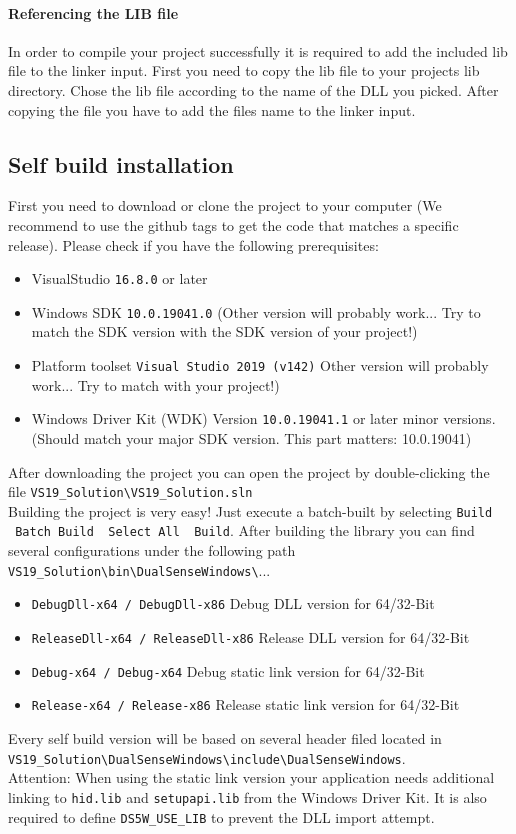 \paragraph{Referencing the LIB file}
In order to compile your project successfully it is required to add the included lib file to the linker input. First you need to copy the lib file to your projects lib directory. Chose the lib file according to the name of the DLL you picked. After copying the file you have to add the files name to the linker input.  

\subsection{Self build installation}
First you need to download or clone the project to your computer (We recommend to use the github tags to get the code that matches a specific release). Please check if you have the following prerequisites:
\begin{itemize}
	\item VisualStudio \texttt{16.8.0} or later
	\item Windows SDK \texttt{10.0.19041.0} (Other version will probably work... Try to match the SDK version with the SDK version of your project!)
	\item Platform toolset \texttt{Visual Studio 2019 (v142)} Other version will probably work... Try to match with your project!)
	\item Windows Driver Kit (WDK) Version \texttt{10.0.19041.1} or later minor versions. (Should match your major SDK version. This part matters: 10.0.19041)
\end{itemize}
After downloading the project you can open the project by double-clicking the file \texttt{VS19\_Solution\textbackslash VS19\_Solution.sln}\\
Building the project is very easy! Just execute a batch-built by selecting \texttt{Build \textrightarrow \ Batch Build \textrightarrow \ Select All \textrightarrow \ Build}. After building the library you can find several configurations under the following path\\
\texttt{VS19\_Solution\textbackslash bin\textbackslash DualSenseWindows\textbackslash}...
\begin{itemize}
	\item \texttt{DebugDll-x64 / DebugDll-x86} Debug DLL version for 64/32-Bit
	\item \texttt{ReleaseDll-x64 / ReleaseDll-x86} Release DLL version for 64/32-Bit
	\item \texttt{Debug-x64 / Debug-x64} Debug static link version for 64/32-Bit
	\item \texttt{Release-x64 / Release-x86} Release static link version for 64/32-Bit
\end{itemize}
Every self build version will be based on several header filed located in \texttt{VS19\_Solution\textbackslash DualSenseWindows\textbackslash include\textbackslash DualSenseWindows}.\\
Attention: When using the static link version your application needs additional linking to \texttt{hid.lib} and \texttt{setupapi.lib} from the Windows Driver Kit. It is also required to define \texttt{DS5W\_USE\_LIB} to prevent the DLL import attempt. 

\newpage